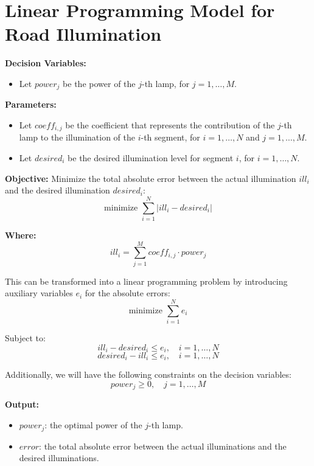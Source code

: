 \documentclass{article}
\begin{document}
\section*{Linear Programming Model for Road Illumination}

\textbf{Decision Variables:}
\begin{itemize}
    \item Let \( power_j \) be the power of the \( j \)-th lamp, for \( j = 1, \ldots, M \).
\end{itemize}

\textbf{Parameters:}
\begin{itemize}
    \item Let \( coeff_{i,j} \) be the coefficient that represents the contribution of the \( j \)-th lamp to the illumination of the \( i \)-th segment, for \( i = 1, \ldots, N \) and \( j = 1, \ldots, M \).
    \item Let \( desired_i \) be the desired illumination level for segment \( i \), for \( i = 1, \ldots, N \).
\end{itemize}

\textbf{Objective:}
Minimize the total absolute error between the actual illumination \( ill_i \) and the desired illumination \( desired_i \):
\[
\text{minimize } \sum_{i=1}^{N} |ill_i - desired_i|
\]

\textbf{Where:}
\[
ill_i = \sum_{j=1}^{M} coeff_{i,j} \cdot power_j
\]

This can be transformed into a linear programming problem by introducing auxiliary variables \( e_i \) for the absolute errors:
\[
\text{minimize } \sum_{i=1}^{N} e_i
\]

Subject to:
\[
ill_i - desired_i \leq e_i, \quad i = 1, \ldots, N
\]
\[
desired_i - ill_i \leq e_i, \quad i = 1, \ldots, N
\]

Additionally, we will have the following constraints on the decision variables:
\[
power_j \geq 0, \quad j = 1, \ldots, M
\]

\textbf{Output:}
\begin{itemize}
    \item \( power_j \): the optimal power of the \( j \)-th lamp.
    \item \( error \): the total absolute error between the actual illuminations and the desired illuminations.
\end{itemize}
\end{document}
